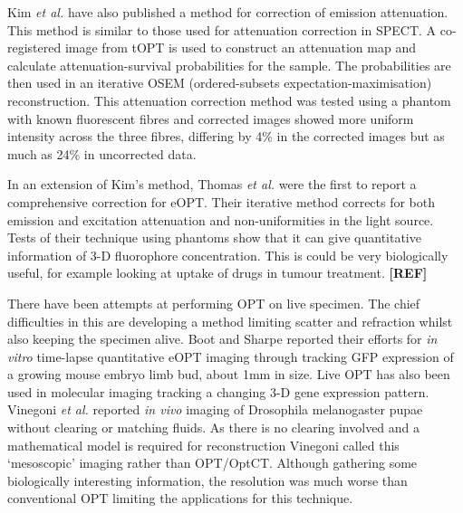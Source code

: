 \documentclass[12pt]{article}
\begin{document}
Kim \textit{et al.} have also published a method for correction of emission attenuation. \cite{Kim:2008eua} This method is similar to those used for attenuation correction in SPECT. A co-registered image from tOPT is used to construct an attenuation map and calculate attenuation-survival probabilities for the sample. The probabilities are then used in an iterative OSEM (ordered-subsets expectation-maximisation) reconstruction. \cite{Kim:2008eua, hudson1994accelerated} This attenuation correction method was tested using a  phantom with known fluorescent fibres and corrected images showed more uniform intensity across the three fibres, differing by 4\% in the corrected images but as much as 24\% in uncorrected data. \cite{Kim:2008eua}

In an extension of Kim's method, Thomas \textit{et al.} were the first to report a comprehensive correction for  eOPT.\cite{Thomas:2010gt} Their iterative method corrects for both emission and excitation attenuation and non-uniformities in the light source. 
Tests of their technique using phantoms show that it can give quantitative information of 3-D fluorophore concentration. This is could be very biologically useful, for example looking at uptake of drugs in tumour treatment. \textbf{[REF]}

  




There have been attempts at performing OPT  on live specimen. \cite{Boot:2008dt, Vinegoni:2008ix, Colas:2009} The chief difficulties in this are developing a method limiting scatter and refraction  whilst also keeping the specimen alive. Boot and Sharpe reported their efforts for \textit{in vitro} time-lapse quantitative eOPT  imaging through tracking GFP expression of a growing mouse embryo limb bud, about 1mm in size. \cite{Boot:2008dt} 
Live OPT has also been used in molecular imaging tracking a changing 3-D gene expression pattern. \cite{Colas:2009}
Vinegoni \textit{et al.} reported \textit{in vivo} imaging of Drosophila melanogaster pupae without clearing or matching fluids. \cite{Vinegoni:2008ix}  As there is no clearing involved and a mathematical model is required for reconstruction Vinegoni called this `mesoscopic' imaging rather than OPT/OptCT.  
Although gathering some biologically interesting information, the resolution was much worse than conventional OPT limiting the applications for this technique. 
\end{document}

